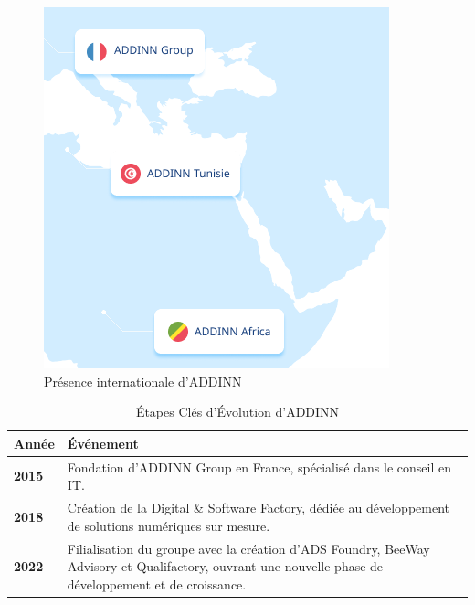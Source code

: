         \begin{minipage}{.45\textwidth}
            \vspace{-1cm}
            \begin{figure}[H]
                \centering
                \includegraphics[width=\linewidth]{chapitres/ch1/img/map.PNG}
                \caption{\centering Présence internationale d'ADDINN\cite{apropos}}
                \label{fig:presence_addinn}
            \end{figure}
        \end{minipage}
        \begin{table}[H]
            \centering
            \caption{Étapes Clés d'Évolution d’ADDINN\cite{apropos}}
            \renewcommand{\arraystretch}{1.5}
            \begin{tabular}{|l|p{15cm}|}
                \hline
                \textbf{Année} & \textbf{Événement} \\
                \hline
                \textbf{2015} & Fondation d’ADDINN Group en France, spécialisé dans le conseil en IT. \\
                \hline
                \textbf{2018} & Création de la Digital \& Software Factory, dédiée au développement de solutions numériques sur mesure. \\
                \hline
                \textbf{2022} & Filialisation du groupe avec la création d’ADS Foundry, BeeWay Advisory et Qualifactory, ouvrant une nouvelle phase de développement et de croissance.  \\
                \hline
            \end{tabular}
            \label{tab:etapes_addinn}
        \end{table}
    \vspace{-0.6cm}
